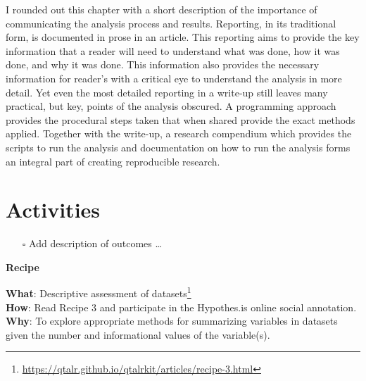 \documentclass[
  letterpaper,
  DIV=11,
  numbers=noendperiod]{scrreport}
\providecommand{\tightlist}{%
  \setlength{\itemsep}{0pt}\setlength{\parskip}{0pt}}\usepackage{longtable,booktabs,array}
\theoremstyle{definition}
\theoremstyle{remark}
\DeclareRobustCommand{\href}[2]{#2\footnote{\url{#1}}}
\begin{document}
I rounded out this chapter with a short description of the importance of
communicating the analysis process and results. Reporting, in its
traditional form, is documented in prose in an article. This reporting
aims to provide the key information that a reader will need to
understand what was done, how it was done, and why it was done. This
information also provides the necessary information for reader's with a
critical eye to understand the analysis in more detail. Yet even the
most detailed reporting in a write-up still leaves many practical, but
key, points of the analysis obscured. A programming approach provides
the procedural steps taken that when shared provide the exact methods
applied. Together with the write-up, a research compendium which
provides the scripts to run the analysis and documentation on how to run
the analysis forms an integral part of creating reproducible research.

\hypertarget{activities-1}{%
\section*{Activities}\label{activities-1}}


\begin{itemize}
\tightlist
\item[$\square$]
   Add description of outcomes \ldots{}
\end{itemize}

\begin{tcolorbox}[enhanced jigsaw, leftrule=.75mm, bottomrule=.15mm, opacityback=0, breakable, left=2mm, colback=white, toprule=.15mm, arc=.35mm, rightrule=.15mm]

\textbf{ Recipe}

\textbf{What}:
\href{https://qtalr.github.io/qtalrkit/articles/recipe-3.html}{Descriptive
assessment of datasets}\\
\textbf{How}: Read Recipe 3 and participate in the Hypothes.is online
social annotation.\\
\textbf{Why}: To explore appropriate methods for summarizing variables
in datasets given the number and informational values of the
variable(s).

\end{tcolorbox}
\end{document}
